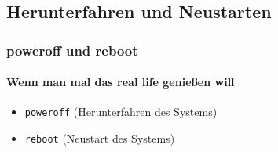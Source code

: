\documentclass[12pt,utf8]{beamer}
\begin{document}
\subsection{Herunterfahren und Neustarten}
\begin{frame}
\frametitle{poweroff und reboot}
\framesubtitle{Wenn man mal das real life genießen will}
\begin{itemize}
	\item \texttt{poweroff} (Herunterfahren des Systems)
	\item \texttt{reboot} (Neustart des Systems)
\end{itemize}
\end{frame}

\end{document}
